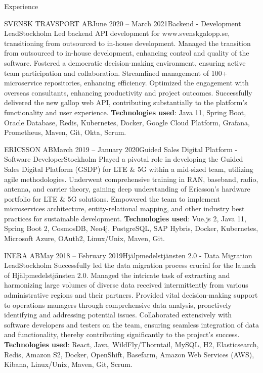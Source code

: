 \documentclass{resume}
\begin{document}
\begin{rSection}{Experience}
    \begin{rSubsection}{SVENSK TRAVSPORT AB}{June 2020 -- March 2021}{Backend - Development Lead}{Stockholm}
      \bItem Led backend API development for www.svenskgalopp.se, transitioning from outsourced to in-house development.
      \bItem Managed the transition from outsourced to in-house development, enhancing control and quality of the software.
      \bItem Fostered a democratic decision-making environment, ensuring active team participation and collaboration.
      \bItem Streamlined management of 100+ microservice repositories, enhancing efficiency.
      \bItem Optimized the engagement with overseas consultants, enhancing productivity and project outcomes.
      \bItem Successfully delivered the new gallop web API, contributing substantially to the platform's functionality and user experience.
      \bItem \textbf{Technologies used}: Java 11, Spring Boot, Oracle Database, Redis, Kubernetes, Docker, Google Cloud Platform, Grafana, Prometheus, Maven, Git, Okta, Scrum.
    \end{rSubsection}

    \begin{rSubsection}{ERICSSON AB}{March 2019 -- January 2020}{Guided Sales Digital Platform - Software Developer}{Stockholm}
      \bItem Played a pivotal role in developing the Guided Sales Digital Platform (GSDP) for LTE \& 5G within a mid-sized team, utilizing agile methodologies.
      \bItem Underwent comprehensive training in RAN, baseband, radio, antenna, and carrier theory, gaining deep understanding of Ericsson's hardware portfolio for LTE \& 5G solutions.
      \bItem Empowered the team to implement microservices architecture, entity-relational mapping, and other industry best practices for sustainable development.
      \bItem \textbf{Technologies used}: Vue.js 2, Java 11, Spring Boot 2, CosmosDB, Neo4j, PostgreSQL, SAP Hybris, Docker, Kubernetes, Microsoft Azure, OAuth2, Linux/Unix, Maven, Git.
    \end{rSubsection}

    \begin{rSubsection}{INERA AB}{May 2018 -- February 2019}{Hjälpmedelstjänsten 2.0 - Data Migration Lead}{Stockholm}
      \bItem Successfully led the data migration process crucial for the launch of Hjälpmedelstjänsten 2.0.
      \bItem Managed the intricate task of extracting and harmonizing large volumes of diverse data received intermittently from various administrative regions and their partners.
      \bItem Provided vital decision-making support to operations managers through comprehensive data analysis, proactively identifying and addressing potential issues.
      \bItem Collaborated extensively with software developers and testers on the team, ensuring seamless integration of data and functionality, thereby contributing significantly to the project's success.
      \bItem \textbf{Technologies used}: React, Java, WildFly/Thorntail, MySQL, H2, Elasticsearch, Redis, Amazon S2, Docker, OpenShift, Basefarm, Amazon Web Services (AWS), Kibana, Linux/Unix, Maven, Git, Scrum.
    \end{rSubsection}


\end{rSection}
\end{document}
